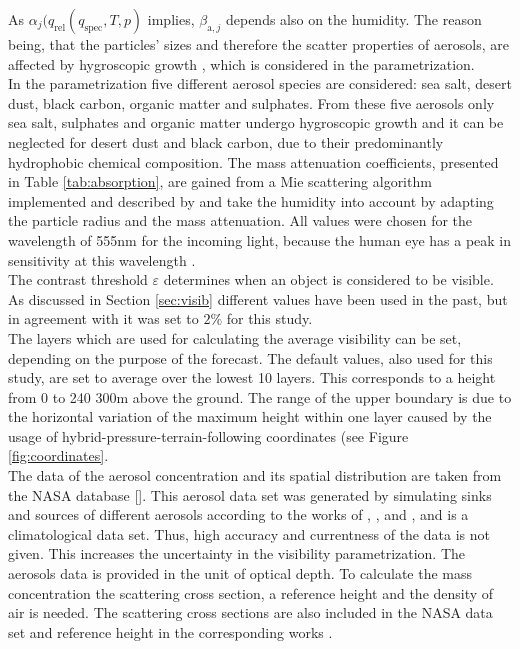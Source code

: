 As $\alpha_{j}(q_{\mathrm{rel}}(q_{\mathrm{spec}}, T ,p)$ implies, $\beta_{\mathrm{a},j}$ depends also on the humidity. The reason being, that the particles' sizes and therefore the scatter properties of aerosols, are affected by hygroscopic growth \cite{lang2010interaction}, which is considered in the parametrization. \\
In the parametrization five different aerosol species are considered: sea salt, desert dust, black carbon, organic matter and sulphates. From these five aerosols only sea salt, sulphates and organic matter undergo hygroscopic growth and it can be neglected for desert dust and black carbon, due to their predominantly hydrophobic chemical composition. The mass attenuation coefficients, presented in Table \ref{tab:absorption}, are gained from a Mie scattering algorithm implemented and described by \citeauthor{reddy2005estimates} \cite{reddy2005estimates} and take the humidity into account by adapting the particle radius and the mass attenuation. All values were chosen for the wavelength of 555nm for the incoming light, because the human eye has a peak in sensitivity at this wavelength \parencite{horvath1981atmospheric, WMO}.\\
The contrast threshold $\varepsilon$ determines when an object is considered to be visible. As discussed in Section \ref{sec:visib}  different values have been used in the past, but in agreement with  \citeauthor{clark2008prediction} \cite{clark2008prediction} it was set to $2 \% $ for this study.\\
The layers which are used for calculating the average visibility can be set, depending on the purpose of the forecast. The default values, also used for this study, are set to average over the lowest 10 layers. This corresponds to a height from 0 to 240 \textendash 300m above the ground. The range of the upper boundary is due to the horizontal variation of the maximum height within one layer caused by the usage of hybrid-pressure-terrain-following coordinates (see Figure \ref{fig:coordinates}.\\
The data of the aerosol concentration and its spatial distribution are taken from the NASA database []. This aerosol data set was generated by simulating sinks and sources of different aerosols according to the works of  \citeauthor{tegen1997contribution} \cite{tegen1997contribution}, \citeauthor{chin1996global} \cite{chin1996global}, \citeauthor{liousse1996global} \cite{liousse1996global} and \citeauthor{tegen1995contribution} \cite{tegen1995contribution}, and is a climatological data set. Thus, high accuracy and currentness of the data is not given. This increases the uncertainty in the visibility parametrization. The aerosols data is provided in the unit of optical depth. To calculate the mass concentration the scattering cross section, a reference height and the density of air is needed. The scattering cross sections are also included in the NASA data set \cite{nasa} and reference height in the corresponding works \cite{tegen1997contribution,chin1996global, liousse1996global,tegen1995contribution}.\\

